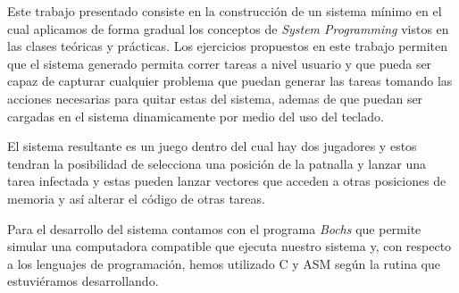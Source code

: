 Este trabajo presentado consiste en la construcción de un sistema mínimo en el cual aplicamos de forma gradual los conceptos de \textit{System Programming} vistos en las clases teóricas y prácticas.
Los ejercicios propuestos en este trabajo permiten que el sistema generado permita correr tareas a nivel usuario y que pueda ser capaz de capturar cualquier problema que puedan generar las tareas tomando las acciones necesarias para quitar estas del sistema, ademas de que puedan ser cargadas en el sistema dinamicamente por medio del uso del teclado.

El sistema resultante es un juego dentro del cual hay dos jugadores y estos tendran la posibilidad de selecciona una posición de la patnalla y lanzar una tarea infectada y estas pueden lanzar vectores que acceden a otras posiciones de memoria y así alterar el código de otras tareas.

Para el desarrollo del sistema contamos con el programa \textit{Bochs} que permite simular una computadora compatible que ejecuta nuestro sistema y, con respecto a los lenguajes de programación, hemos utilizado C y ASM según la rutina que estuviéramos desarrollando.
